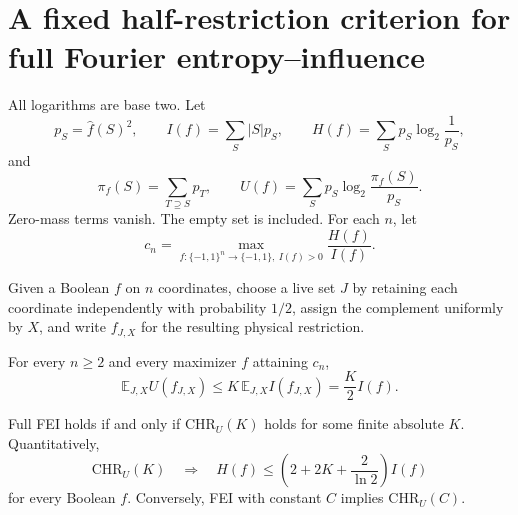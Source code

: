 \section*{A fixed half-restriction criterion for full Fourier entropy--influence}

All logarithms are base two.  Let
\[
 p_S=\widehat f(S)^2,\qquad
 I(f)=\sum_S|S|p_S,\qquad
 H(f)=\sum_Sp_S\log_2\frac1{p_S},
\]
and
\[
 \pi_f(S)=\sum_{T\supseteq S}p_T,\qquad
 U(f)=\sum_Sp_S\log_2\frac{\pi_f(S)}{p_S}.
\]
Zero-mass terms vanish.  The empty set is included.  For each $n$, let
\[
 c_n=\max_{f:\{-1,1\}^n\to\{-1,1\},\ I(f)>0}\frac{H(f)}{I(f)}.
\]

Given a Boolean $f$ on $n$ coordinates, choose a live set $J$ by retaining
each coordinate independently with probability $1/2$, assign the complement
uniformly by $X$, and write $f_{J,X}$ for the resulting physical restriction.

\begin{definition}
For every $n\ge2$ and every maximizer $f$ attaining $c_n$,
\[
 \boxed{\quad
 \mathbb E_{J,X}U(f_{J,X})\le
 K\,\mathbb E_{J,X}I(f_{J,X})=\frac K2 I(f).
 \quad}                                                   \tag{CHR}
\]
\end{definition}

\begin{theorem}
Full FEI holds if and only if $\mathrm{CHR}_U(K)$ holds for some finite
absolute $K$.  Quantitatively,
\[
 \mathrm{CHR}_U(K)\quad\Longrightarrow\quad
 H(f)\le\left(2+2K+\frac2{\ln2}\right)I(f)               \tag{1}
\]
for every Boolean $f$.  Conversely, FEI with constant $C$ implies
$\mathrm{CHR}_U(C)$.
\end{theorem}

